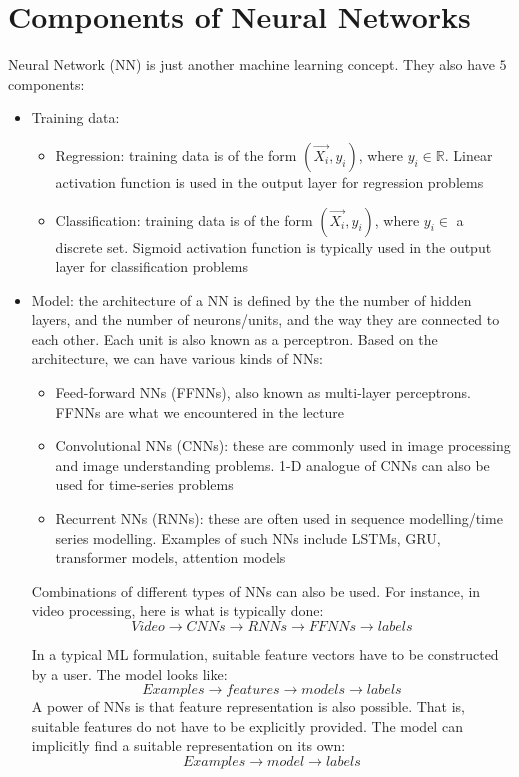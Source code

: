 \documentclass[11pt, twosides]{article}
\begin{document}
\section{Components of Neural Networks}

Neural Network (NN) is just another machine learning concept. They also have $5$ components:

\begin{itemize}
    \item Training data:
    \begin{itemize}
        \item Regression: training data is of the form $\left(\Vec{X_i}, y_i \right)$, where $y_i \in \mathbb{R}$. Linear activation function is used in the output layer for regression problems
        \item Classification: training data is of the form $\left(\Vec{X_i}, y_i \right)$, where $y_i \in$ a discrete set. Sigmoid activation function is typically used in the output layer for classification problems
    \end{itemize}
    
    \item Model: the architecture of a NN is defined by the the number of hidden layers, and the number of neurons/units, and the way they are connected to each other. Each unit is also known as a perceptron. Based on the architecture, we can have various kinds of NNs:
    \begin{itemize}
        \item Feed-forward NNs (FFNNs), also known as multi-layer perceptrons. FFNNs are what we encountered in the lecture
        \item Convolutional NNs (CNNs): these are commonly used in image processing and image understanding problems. 1-D analogue of CNNs can also be used for time-series problems
        \item Recurrent NNs (RNNs): these are often used in sequence modelling/time series modelling. Examples of such NNs include LSTMs, GRU, transformer models, attention models
    \end{itemize}
    Combinations of different types of NNs can also be used. For instance, in video processing, here is what is typically done:
    $$Video \rightarrow CNNs \rightarrow RNNs \rightarrow FFNNs \rightarrow labels$$
    
    In a typical ML formulation, suitable feature vectors have to be constructed by a user. The model looks like: 
    $$Examples \rightarrow features \rightarrow models \rightarrow labels$$
    A power of NNs is that feature representation is also possible. That is, suitable features do not have to be explicitly provided. The model can implicitly find a suitable representation on its own:
    $$Examples \rightarrow model \rightarrow labels$$
    

\end{itemize}
\end{document}
